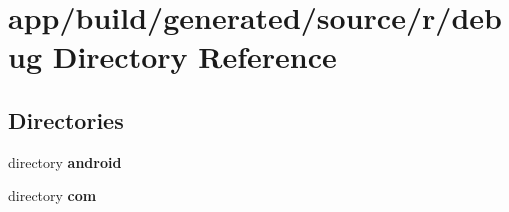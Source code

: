 \section{app/build/generated/source/r/debug Directory Reference}
\label{dir_52d4407563f9979a0bd6c97588ce2670}
\subsection*{Directories}
\begin{DoxyCompactItemize}
\item 
directory {\bf android}
\item 
directory {\bf com}
\end{DoxyCompactItemize}
